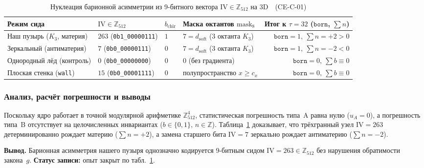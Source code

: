 \begin{table}[htbp]
\centering
\footnotesize
\setlength{\tabcolsep}{4pt}
\caption{Нуклеация барионной асимметрии из 9-битного вектора $\mathrm{IV}\in\mathbb{Z}_{512}$ на 3D~\latGCKshort\ (CE-C-01)}
\label{tab:exp-ce-c-01}
\begin{tabular}{@{}llllr@{}}
\toprule
Режим сида & $\mathrm{IV}\in\mathbb{Z}_{512}$ & $b_{\mathrm{chir}}$ & Маска октантов $\mathrm{mask}_8$ & Итог к $\tau=32$ ($\texttt{born}$, $\sum n$) \\
\midrule
Наш пузырь ($K_3$, материя) & $263$ (\texttt{0b1\_00000111}) & $1$ & $7 = d_{\mathrm{soft}}$ ($3$ октанта $K_3$) & $\texttt{born}=1,\ \sum n = +2 > 0$ \\
Зеркальный (антиматерия) & $7$ (\texttt{0b0\_00000111}) & $0$ & $7 = d_{\mathrm{soft}}$ ($3$ октанта $K_3$) & $\texttt{born}=1,\ \sum n = -2 < 0$ \\
Однородный лёд (контроль) & $0$ (\texttt{0b0\_00000000}) & $0$ & $0$ (без градиента) & $\texttt{born}=0,\ \sum b \equiv 0$ \\
Плоская стенка (\texttt{wall}) & $15$ (\texttt{0b0\_00001111}) & $0$ & полупространство $x\ge c_x$ & $\texttt{born}=0,\ \sum b \equiv 0$ \\
\bottomrule
\end{tabular}
\end{table}

\subsubsection*{Анализ, расчёт погрешности и выводы}
Поскольку ядро работает в точной модулярной арифметике $\mathbb{Z}_{512}^4$, статистическая погрешность типа~A равна нулю ($u_A = 0$), а погрешность типа~B отсутствует на целочисленных инвариантах ($b\in\{0,1\}$, $n\in\mathbb{Z}$).
Таблица~\ref{tab:exp-ce-c-01} доказывает, что трёхгранный узел $\mathrm{IV}=263$ детерминированно рождает материю ($\sum n = +2$), а замена старшего бита $\mathrm{IV}=7$ зеркально рождает антиматерию ($\sum n = -2$).

\textbf{Вывод.}
Барионная асимметрия нашего пузыря однозначно кодируется 9-битным сидом $\mathrm{IV}=263\in\mathbb{Z}_{512}$ без нарушения обратимости закона~$g$.
\textbf{Статус записи:} опыт закрыт по табл.~\ref{tab:exp-ce-c-01}.
